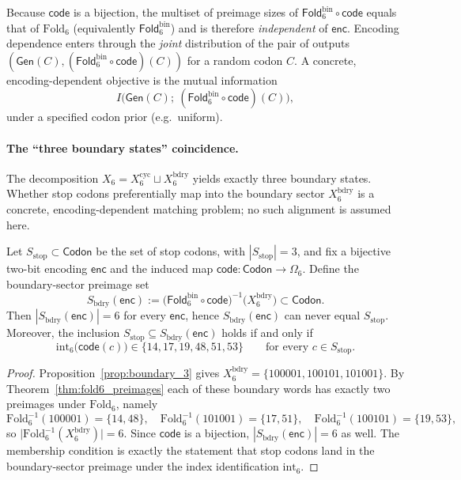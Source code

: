 \begin{remark}
Because $\mathsf{code}$ is a bijection, the multiset of preimage sizes of $\mathsf{Fold}^{\mathrm{bin}}_6\circ \mathsf{code}$ equals that of $\mathrm{Fold}_6$ (equivalently $\mathsf{Fold}^{\mathrm{bin}}_6$) and is therefore \emph{independent} of $\mathsf{enc}$.
Encoding dependence enters through the \emph{joint} distribution of the pair of outputs $(\mathsf{Gen}(C),(\mathsf{Fold}^{\mathrm{bin}}_6\circ\mathsf{code})(C))$ for a random codon $C$.
A concrete, encoding-dependent objective is the mutual information
\[
I\bigl(\mathsf{Gen}(C);\ (\mathsf{Fold}^{\mathrm{bin}}_6\circ \mathsf{code})(C)\bigr),
\]
under a specified codon prior (e.g.\ uniform).
\end{remark}

\paragraph{The ``three boundary states'' coincidence.}
The decomposition $X_6=X_6^{\mathrm{cyc}}\sqcup X_6^{\mathrm{bdry}}$ yields exactly three boundary states.
Whether stop codons preferentially map into the boundary sector $X_6^{\mathrm{bdry}}$ is a concrete, encoding-dependent matching problem; no such alignment is assumed here.

\begin{proposition}
\label{prop:stop_subset_boundary}
Let $S_{\mathrm{stop}}\subset \mathsf{Codon}$ be the set of stop codons, with $|S_{\mathrm{stop}}|=3$, and fix a bijective two-bit encoding $\mathsf{enc}$ and the induced map $\mathsf{code}:\mathsf{Codon}\to\Omega_6$.
Define the boundary-sector preimage set
\[
S_{\mathrm{bdry}}(\mathsf{enc}):=\bigl(\mathsf{Fold}^{\mathrm{bin}}_6\circ \mathsf{code}\bigr)^{-1}\!\bigl(X_6^{\mathrm{bdry}}\bigr)\subset \mathsf{Codon}.
\]
Then $|S_{\mathrm{bdry}}(\mathsf{enc})|=6$ for every $\mathsf{enc}$, hence $S_{\mathrm{bdry}}(\mathsf{enc})$ can never equal $S_{\mathrm{stop}}$.
Moreover, the inclusion $S_{\mathrm{stop}}\subseteq S_{\mathrm{bdry}}(\mathsf{enc})$ holds if and only if
\[
\mathrm{int}_6\bigl(\mathsf{code}(c)\bigr)\in \{14,17,19,48,51,53\}
\qquad \text{for every }c\in S_{\mathrm{stop}}.
\]
\end{proposition}

\begin{proof}
Proposition~\ref{prop:boundary_3} gives $X_6^{\mathrm{bdry}}=\{100001,100101,101001\}$.
By Theorem~\ref{thm:fold6_preimages} each of these boundary words has exactly two preimages under $\mathrm{Fold}_6$, namely
\[
\mathrm{Fold}_6^{-1}(100001)=\{14,48\},\quad
\mathrm{Fold}_6^{-1}(101001)=\{17,51\},\quad
\mathrm{Fold}_6^{-1}(100101)=\{19,53\},
\]
so $\bigl|\mathrm{Fold}_6^{-1}(X_6^{\mathrm{bdry}})\bigr|=6$.
Since $\mathsf{code}$ is a bijection, $|S_{\mathrm{bdry}}(\mathsf{enc})|=6$ as well.
The membership condition is exactly the statement that stop codons land in the boundary-sector preimage under the index identification $\mathrm{int}_6$.
\end{proof}

